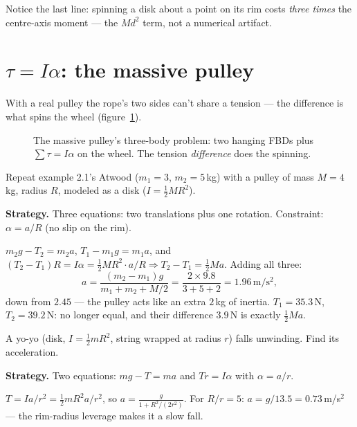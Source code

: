 Notice the last line: spinning a disk about a point on its rim costs
\emph{three times} the centre-axis moment --- the $Md^{2}$ term, not a
numerical artifact.

\section{$\tau=I\alpha$: the massive pulley}\label{sec:rot-tia}

With a real pulley the rope's two sides can't share a tension --- the
difference is what spins the wheel (figure~\ref{fig:pulley}).

\begin{figure}[htbp]\centering

\caption{The massive pulley's three-body problem: two hanging FBDs plus
$\sum\tau=I\alpha$ on the wheel. The tension \emph{difference} does the
spinning.}
\label{fig:pulley}
\end{figure}

\begin{example}\label{ex:mpulley}
Repeat example 2.1's Atwood ($m_1=3$, $m_2=5$\,kg) with a pulley of mass
$M=4$\,kg, radius $R$, modeled as a disk ($I=\tfrac12MR^{2}$).
\par\smallskip
\textbf{Strategy.} Three equations: two translations plus one rotation.
Constraint: $\alpha=a/R$ (no slip on the rim).
\begin{solution}
$m_2g-T_2=m_2a$, $T_1-m_1g=m_1a$, and
$(T_2-T_1)R=I\alpha=\tfrac12MR^{2}\cdot a/R \Rightarrow T_2-T_1=\tfrac12Ma$.
Adding all three:
\[
  a=\frac{(m_2-m_1)g}{m_1+m_2+M/2}
   =\frac{2\times9.8}{3+5+2}=1.96\,\mathrm{m/s^{2}},
\]
down from $2.45$ --- the pulley acts like an extra $2$\,kg of inertia.
$T_1=35.3$\,N, $T_2=39.2$\,N: no longer equal, and their difference
$3.9$\,N is exactly $\tfrac12Ma$. \checkmark
\end{solution}
\end{example}

\begin{example}[Yo-yo unwinding]\label{ex:yoyo}
A yo-yo (disk, $I=\tfrac12mR^{2}$, string wrapped at radius $r$) falls
unwinding. Find its acceleration.
\par\smallskip
\textbf{Strategy.} Two equations: $mg-T=ma$ and $Tr=I\alpha$ with
$\alpha=a/r$.
\begin{solution}
$T=I a/r^{2}=\tfrac12mR^{2}a/r^{2}$, so
$a=\frac{g}{1+R^{2}/(2r^{2})}$. For $R/r=5$: $a=g/13.5=0.73$\,m/s$^{2}$
--- the rim-radius leverage makes it a slow fall. \checkmark
\end{solution}
\end{example}

